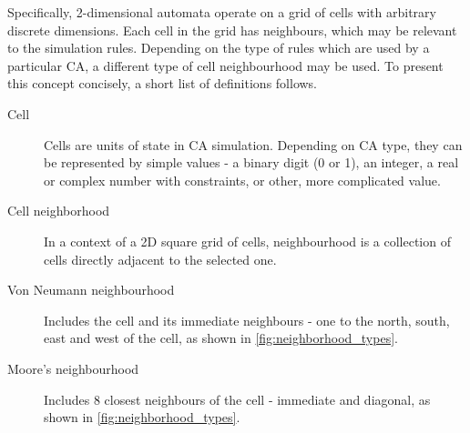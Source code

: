 \documentclass[12pt]{report}
\begin{document}
Specifically, 2-dimensional automata operate on a grid of cells with arbitrary discrete dimensions. Each cell in the grid has neighbours, which may be relevant to the simulation rules. Depending on the type of rules which are used by a particular CA, a different type of cell neighbourhood may be used. To present this concept concisely, a short list of definitions follows.

\begin{description}
	\item[Cell] Cells are units of state in CA simulation. Depending on CA type, they can be represented by simple values - a binary digit (0 or 1), an integer, a real or complex number with constraints, or other, more complicated value.  
	\item[Cell neighborhood] In a context of a 2D square grid of cells, neighbourhood is a collection of cells directly adjacent to the selected one.
	\item[Von Neumann neighbourhood] Includes the cell and its immediate neighbours - one to the north, south, east and west of the cell, as shown in  \cref{fig:neighborhood_types}.
	\item[Moore's neighbourhood] Includes 8 closest neighbours of the cell - immediate and diagonal, as shown in  \cref{fig:neighborhood_types}.
\end{description}
 
\end{document}
